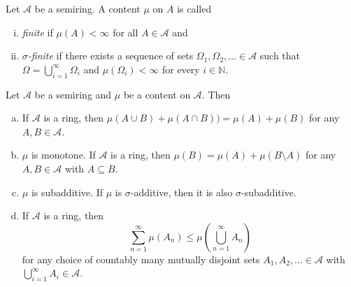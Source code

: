 \begin{definition}
    Let $\mathcal{A}$ be a semiring. A content $\mu$ on $A$ is called
    \begin{enumerate}[(i)]
        \item \textit{finite} if $\mu(A)<\infty$ for all $A\in\mathcal{A}$ and
        \item \textit{$\sigma$-finite} if there exists a sequence of sets $\Omega_1,\Omega_2,\ldots\in\mathcal{A}$ such that $\Omega=\bigcup_{i=1}^\infty\Omega_i$ and $\mu(\Omega_i)<\infty$ for every $i\in\mathbb{N}$.
    \end{enumerate}
\end{definition}

\vspace{2mm}
\begin{theorem}
\label{properties of content}
    Let $\mathcal{A}$ be a semiring and $\mu$ be a content on $\mathcal{A}$. Then
    \begin{enumerate}[(a)]
        \item If $\mathcal{A}$ is a ring, then $\mu(A\cup B)+\mu(A\cap B))=\mu(A)+\mu(B)$ for any $A,B\in\mathcal{A}$.
        
        \item $\mu$ is monotone. If $\mathcal{A}$ is a ring, then $\mu(B)=\mu(A)+\mu(B\setminus A)$ for any $A,B\in\mathcal{A}$ with $A\subseteq B$.
        
        \item $\mu$ is subadditive. If $\mu$ is $\sigma$-additive, then it is also $\sigma$-subadditive.
        
        \item If $\mathcal{A}$ is a ring, then $$\sum_{n=1}^\infty \mu(A_n)\leq\mu\left(\bigcup_{n=1}^\infty A_n\right)$$ for any choice of countably many mutually disjoint sets $A_1,A_2,\ldots\in\mathcal{A}$ with $\bigcup_{i=1}^\infty A_i\in\mathcal{A}$.
    \end{enumerate}
\end{theorem}
